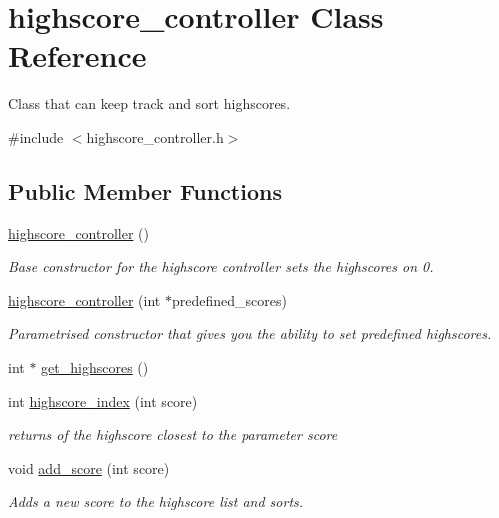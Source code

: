 \hypertarget{classhighscore__controller}{}\section{highscore\+\_\+controller Class Reference}
\label{classhighscore__controller}


Class that can keep track and sort highscores.  




{\ttfamily \#include $<$highscore\+\_\+controller.\+h$>$}

\subsection*{Public Member Functions}
\begin{DoxyCompactItemize}
\item 
\hyperlink{classhighscore__controller_ac6892088b27303398b73d511bbab7af9}{highscore\+\_\+controller} ()\hypertarget{classhighscore__controller_ac6892088b27303398b73d511bbab7af9}{}\label{classhighscore__controller_ac6892088b27303398b73d511bbab7af9}

\begin{DoxyCompactList}\small\item\em Base constructor for the highscore controller sets the highscores on 0. \end{DoxyCompactList}\item 
\hyperlink{classhighscore__controller_a6387cc8b2bab3f385f29478a38ac3bad}{highscore\+\_\+controller} (int $\ast$predefined\+\_\+scores)
\begin{DoxyCompactList}\small\item\em Parametrised constructor that gives you the ability to set predefined highscores. \end{DoxyCompactList}\item 
int $\ast$ \hyperlink{classhighscore__controller_a387ac4f4d36c1e1d521d16b7923f6f89}{get\+\_\+highscores} ()
\item 
int \hyperlink{classhighscore__controller_a40b5b1a5c5abc0f9e2e0db952204f2ad}{highscore\+\_\+index} (int score)
\begin{DoxyCompactList}\small\item\em returns of the highscore closest to the parameter score \end{DoxyCompactList}\item 
void \hyperlink{classhighscore__controller_ac6815353165fe4c6ef891a3d42486fa6}{add\+\_\+score} (int score)
\begin{DoxyCompactList}\small\item\em Adds a new score to the highscore list and sorts. \end{DoxyCompactList}\end{DoxyCompactItemize}
